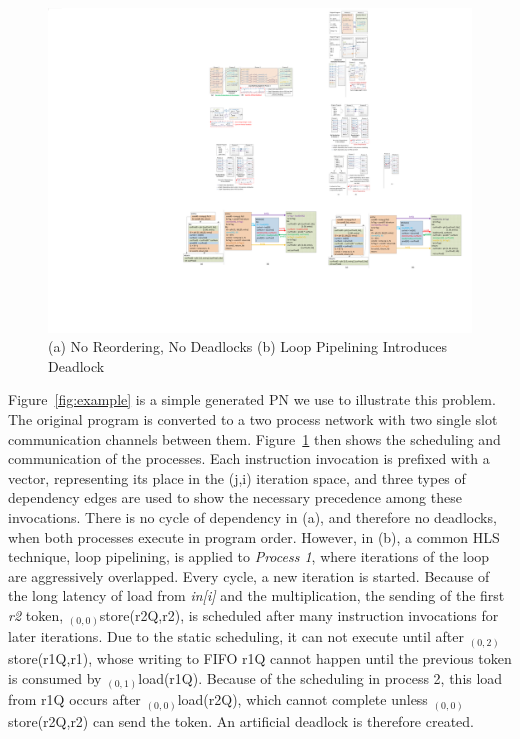 \documentclass{sig-alternate}
\begin{document}
\begin{figure}[htp]
\begin{center}
\includegraphics[width=1.0\linewidth]{fig/twoSchedules.pdf}
\caption{(a) No Reordering, No Deadlocks (b) Loop Pipelining Introduces Deadlock
\label{fig:2schedules}}
\end{center}
\vspace{-2.0em}
\end{figure}

Figure~\ref{fig:example} is a simple generated PN we use to illustrate this problem. The original program is converted to a two process network
with two single slot communication channels between them.
Figure~\ref{fig:2schedules} then shows the scheduling and communication of the processes. Each instruction invocation is prefixed with a vector, representing its place in the (j,i) iteration space, and three types of dependency edges are used
to show the necessary precedence among these invocations. There is no cycle of
dependency in (a), and therefore no deadlocks, when both processes execute in program order. However, in (b), 
a common HLS technique, loop pipelining, is applied to \textit{Process 1}, where
iterations of the loop are aggressively overlapped. Every cycle, a new iteration is started. Because of the long latency of load from \textit{in[i]} and
the multiplication, the sending of the first \textit{r2} token, $_{(0,0)}$store(r2Q,r2), is scheduled
after many instruction invocations for later iterations. Due to the static scheduling, it can not execute until after $_{(0,2)}$store(r1Q,r1), whose
writing to FIFO r1Q cannot happen until the previous token is consumed by 
$_{(0,1)}$load(r1Q). Because of the scheduling in process 2, this load from r1Q
occurs after $_{(0,0)}$load(r2Q), which cannot complete unless $_{(0,0)}$store(r2Q,r2)
can send the token.  An artificial deadlock is therefore created. 
\end{document}

